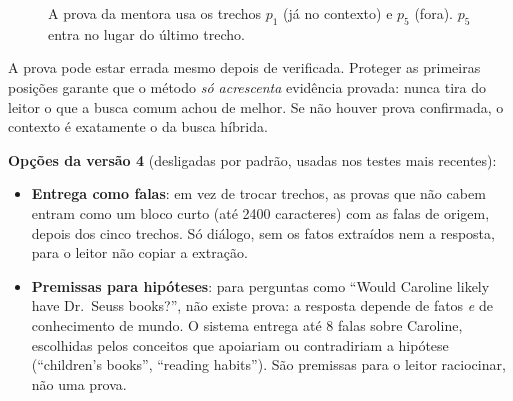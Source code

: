 \documentclass[11pt]{article}
\begin{document}
\begin{figure}[H]
\centering
{}
\caption{A prova da mentora usa os trechos $p_1$ (já no contexto) e $p_5$
(fora). $p_5$ entra no lugar do último trecho.}
\label{fig:contexto}
\end{figure}

\begin{porque}
A prova pode estar errada mesmo depois de verificada. Proteger as primeiras
posições garante que o método \emph{só acrescenta} evidência provada: nunca
tira do leitor o que a busca comum achou de melhor. Se não houver prova
confirmada, o contexto é exatamente o da busca híbrida.
\end{porque}

\textbf{Opções da versão 4} (desligadas por padrão, usadas nos testes mais
recentes):
\begin{itemize}
\item \textbf{Entrega como falas}: em vez de trocar trechos, as provas que não
  cabem entram como um bloco curto (até 2400 caracteres) com as falas de
  origem, depois dos cinco trechos. Só diálogo, sem os fatos extraídos nem a
  resposta, para o leitor não copiar a extração.
\item \textbf{Premissas para hipóteses}: para perguntas como ``Would Caroline
  likely have Dr.\ Seuss books?'', não existe prova: a resposta depende de
  fatos \emph{e} de conhecimento de mundo. O sistema entrega até 8 falas sobre
  Caroline, escolhidas pelos conceitos que apoiariam ou contradiriam a
  hipótese (``children's books'', ``reading habits''). São premissas para o
  leitor raciocinar, não uma prova.
\end{itemize}
\end{document}
